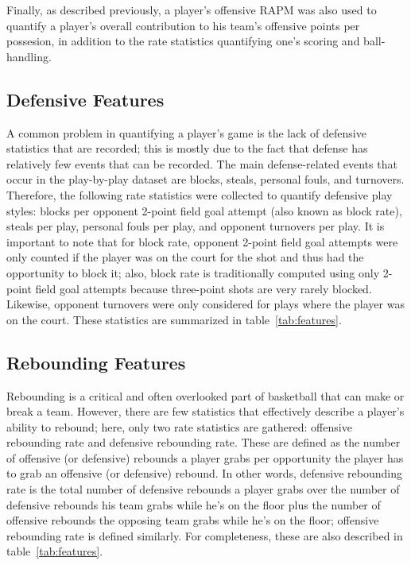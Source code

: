 Finally, as described previously, a player's offensive RAPM was also used to
quantify a player's overall contribution to his team's offensive points per
possesion, in addition to the rate statistics quantifying one's scoring and
ball-handling.

\subsection{Defensive Features}

A common problem in quantifying a player's game is the lack of defensive statistics
that are recorded; this is mostly due to the fact that defense has relatively few
events that can be recorded. The main defense-related events that occur in the
play-by-play dataset are blocks, steals, personal fouls, and turnovers. Therefore,
the following rate statistics were collected to quantify defensive play styles:
blocks per opponent 2-point field goal attempt (also known as block rate), steals
per play, personal fouls per play, and opponent turnovers per play. It is important
to note that for block rate, opponent 2-point field goal attempts were only counted
if the player was on the court for the shot and thus had the opportunity to block
it; also, block rate is traditionally computed using only 2-point field goal
attempts because three-point shots are very rarely blocked. Likewise, opponent
turnovers were only considered for plays where the player was on the court. These
statistics are summarized in table~\ref{tab:features}.

\subsection{Rebounding Features}

Rebounding is a critical and often overlooked part of basketball that can make or
break a team. However, there are few statistics that effectively describe a player's
ability to rebound; here, only two rate statistics are gathered: offensive
rebounding rate and defensive rebounding rate. These are defined as the number of
offensive (or defensive) rebounds a player grabs per opportunity the player has to
grab an offensive (or defensive) rebound. In other words, defensive rebounding rate
is the total number of defensive rebounds a player grabs over the number of
defensive rebounds his team grabs while he's on the floor plus the number of
offensive rebounds the opposing team grabs while he's on the floor; offensive
rebounding rate is defined similarly. For completeness, these are also described in
table~\ref{tab:features}.

